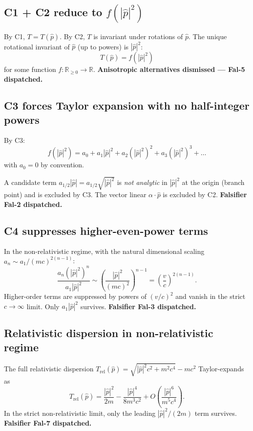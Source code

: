 \documentclass[11pt,a4paper]{article}
\begin{document}
\subsection{C1 + C2 reduce to $f(|\hat{p}|^2)$}

By C1, $T = T(\hat{p})$. By C2, $T$ is invariant under rotations of $\hat{p}$. The unique rotational invariant of $\hat{p}$ (up to powers) is $|\hat{p}|^2$:
\begin{equation}
T(\hat{p}) = f(|\hat{p}|^2) \label{eq:fhat}
\end{equation}
for some function $f : \mathbb{R}_{\geq 0} \to \mathbb{R}$. \textbf{Anisotropic alternatives dismissed --- Fal-5 dispatched.}

\subsection{C3 forces Taylor expansion with no half-integer powers}

By C3:
\begin{equation}
f(|\hat{p}|^2) = a_0 + a_1 |\hat{p}|^2 + a_2 (|\hat{p}|^2)^2 + a_3 (|\hat{p}|^2)^3 + \ldots
\end{equation}
with $a_0 = 0$ by convention.

A candidate term $a_{1/2} |\hat{p}| = a_{1/2} \sqrt{|\hat{p}|^2}$ is \emph{not analytic} in $|\hat{p}|^2$ at the origin (branch point) and is excluded by C3. The vector linear $\alpha \cdot \hat{p}$ is excluded by C2. \textbf{Falsifier Fal-2 dispatched.}

\subsection{C4 suppresses higher-even-power terms}

In the non-relativistic regime, with the natural dimensional scaling $a_n \sim a_1/(mc)^{2(n-1)}$:
\[
\frac{a_n (|\hat{p}|^2)^n}{a_1 |\hat{p}|^2} \sim \left( \frac{|\hat{p}|^2}{(mc)^2} \right)^{n-1} = \left( \frac{v}{c} \right)^{2(n-1)}.
\]
Higher-order terms are suppressed by powers of $(v/c)^2$ and vanish in the strict $c \to \infty$ limit. Only $a_1 |\hat{p}|^2$ survives. \textbf{Falsifier Fal-3 dispatched.}

\subsection{Relativistic dispersion in non-relativistic regime}

The full relativistic dispersion $T_\mathrm{rel}(\hat{p}) = \sqrt{|\hat{p}|^2 c^2 + m^2 c^4} - m c^2$ Taylor-expands as
\[
T_\mathrm{rel}(\hat{p}) = \frac{|\hat{p}|^2}{2m} - \frac{|\hat{p}|^4}{8 m^3 c^2} + O\!\left( \frac{|\hat{p}|^6}{m^5 c^4} \right).
\]
In the strict non-relativistic limit, only the leading $|\hat{p}|^2/(2m)$ term survives. \textbf{Falsifier Fal-7 dispatched.}
\end{document}
